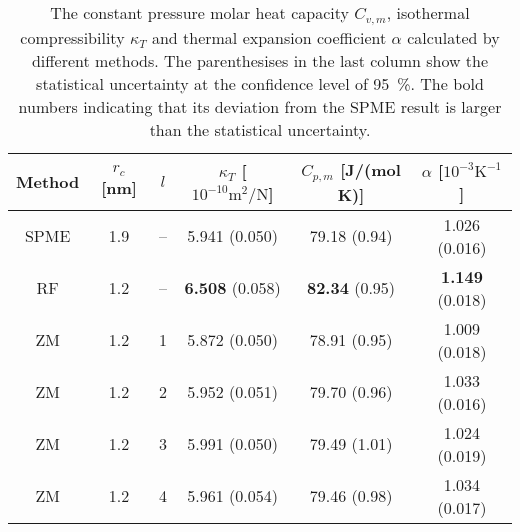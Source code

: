 \documentclass[aip,jcp,a4paper,reprint,unsortedaddress,onecolumn,fleqn]{revtex4-1}
\begin{document}

\begin{table}
  \centering
  \caption{The constant pressure molar heat capacity $C_{v,m}$, isothermal compressibility $\kappa_T$ and
    thermal expansion coefficient $\alpha$
    calculated by different methods.    
    The parenthesises in the last column show the statistical uncertainty
    at the confidence level of 95~\%.
    The bold numbers indicating that its deviation from the SPME result is larger than the statistical uncertainty.
  }
  \begin{tabular*}{0.9\textwidth}{@{\extracolsep{\fill}}ccc ccc}\hline\hline
    Method      &   $r_c$ [nm] &    $l$      & $\kappa_T$ [$10^{-10}\textrm{m}^2/\textrm{N}$] & $C_{p,m}$ [J/(mol K)] & $\alpha$ [$10^{-3}\textrm{K}^{-1}$]\\\hline
    SPME        &         1.9     &       --      & 5.941 (0.050)               &79.18 (0.94)           &1.026 (0.016)          \\
    RF          &         1.2     & --            & \textbf{6.508} (0.058)      &\textbf{82.34} (0.95)  &\textbf{1.149} (0.018) \\
    ZM          &         1.2     &       1       & 5.872 (0.050)               &78.91 (0.95)           &1.009 (0.018)          \\
    ZM          &         1.2     &       2       & 5.952 (0.051)               &79.70 (0.96)           &1.033 (0.016)          \\
    ZM          &         1.2     &       3       & 5.991 (0.050)               &79.49 (1.01)           &1.024 (0.019)          \\
    ZM          &         1.2     &       4       & 5.961 (0.054)               &79.46 (0.98)           &1.034 (0.017)          \\
    \hline\hline
  \end{tabular*}
  \label{tab:tmp3a}
\end{table}
\end{document}
